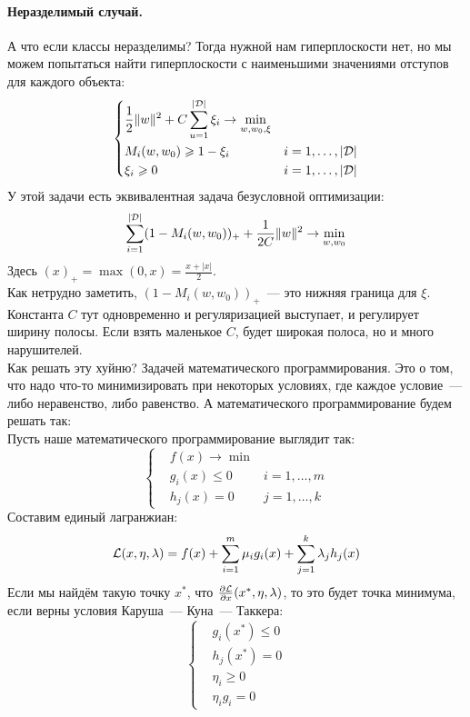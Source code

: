 \documentclass{article}
\begin{document}
    \paragraph{Неразделимый случай.}
    А что если классы неразделимы? Тогда нужной нам гиперплоскости нет, но мы можем попытаться найти гиперплоскости с наименьшими значениями отступов для каждого объекта:
    \[
    \left\{\begin{aligned}
        &\frac12\|w\|^2+C\sum\limits_{u=1}^{|{\mathcal{D}}|}\xi_i\to\min_{w,w_0,\xi}&\\
        &M_i(w,w_0)\geqslant1-\xi_i&i=1,\ldots,|{\mathcal{D}}|\\
        &\xi_i\geqslant0&i=1,\ldots,|{\mathcal{D}}|
    \end{aligned}\right.
    \]
    У этой задачи есть эквивалентная задача безусловной оптимизации:
    \[
    \sum\limits_{i=1}^{|{\mathcal{D}}|}(1-M_i(w,w_0))_++\frac1{2C}\|w\|^2\to\min_{w,w_0}
    \]
    Здесь $(x)_+=\max(0,x)=\frac{x+|x|}2$.\\
    Как нетрудно заметить, $(1-M_i(w,w_0))_+$~--- это нижняя граница для $\xi$.\\
    Константа $C$ тут одновременно и регуляризацией выступает, и регулирует ширину полосы. Если взять маленькое $C$, будет широкая полоса, но и много нарушителей.\\
    Как решать эту хуйню? Задачей математического программирования. Это о том, что надо что-то минимизировать при некоторых условиях, где каждое условие~--- либо неравенство, либо равенство. А математического программирование будем решать так:\\
    Пусть наше математического программирование выглядит так:
    \[
    \left\{\begin{aligned}
        &f(x)\to\min&\\
        &g_i(x)\leqslant0&i=1,\ldots,m\\
        &h_j(x)=0&j=1,\ldots,k
    \end{aligned}\right.
    \]
    Составим единый лагранжиан:
    \[
    {\mathcal{L}}(x,\eta,\lambda)=f(x)+\sum\limits_{i=1}^m\mu_ig_i(x)+\sum\limits_{j=1}^k\lambda_jh_j(x)
    \]
    Если мы найдём такую точку $x^*$, что $\frac{\partial{\mathcal{L}}}{\partial x}(x^*,\eta,\lambda)$, то это будет точка минимума, если верны условия Каруша~--- Куна~--- Таккера:
    \[
    \left\{\begin{aligned}
        &g_i(x^*)\leqslant0\\
        &h_j(x^*)=0\\
        &\eta_i\geqslant0\\
        &\eta_ig_i=0
    \end{aligned}\right.
    \]
\end{document}
